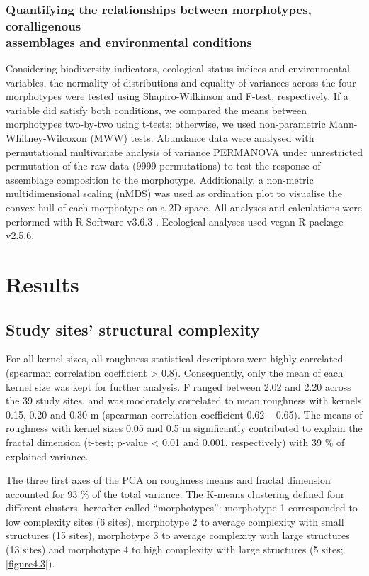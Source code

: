 \subsubsection{Quantifying the relationships between morphotypes, coralligenous\\ assemblages and environmental conditions }\label{chapitre4_2.5.2}
Considering biodiversity indicators, ecological status indices and environmental variables, the normality of distributions and equality of variances across the four morphotypes were tested using Shapiro-Wilkinson and F-test, respectively. If a variable did satisfy both conditions, we compared the means between morphotypes two-by-two using t-tests; otherwise, we used non-parametric Mann-Whitney-Wilcoxon (MWW) tests. Abundance data were analysed with permutational multivariate analysis of variance PERMANOVA \citep{anderson_new_2001} under unrestricted permutation of the raw data (9999 permutations) to test the response of assemblage composition to the morphotype. Additionally, a non-metric multidimensional scaling (nMDS) \citep{clarke_primer_2006} was used as ordination plot to visualise the convex hull of each morphotype on a 2D space. All analyses and calculations were performed with R Software v3.6.3 \citep{r_core_team_r_2020}. Ecological analyses used vegan R package v2.5.6.

\section{Results}\label{chapitre4_3}

\subsection{Study sites’ structural complexity}\label{chapitre4_3.1}
For all kernel sizes, all roughness statistical descriptors were highly correlated (spearman correlation coefficient > 0.8). Consequently, only the mean of each kernel size was kept for further analysis. F ranged between 2.02 and 2.20 across the 39 study sites, and was moderately correlated to mean roughness with kernels 0.15, 0.20 and 0.30 m (spearman correlation coefficient 0.62 – 0.65). The means of roughness with kernel sizes 0.05 and 0.5 m significantly contributed to explain the fractal dimension (t-test; p-value < 0.01 and 0.001, respectively) with 39 \% of explained variance.

The three first axes of the PCA on roughness means and fractal dimension accounted for 93 \% of the total variance. The K-means clustering defined four different clusters, hereafter called “morphotypes”: morphotype 1 corresponded to low complexity sites (6 sites), morphotype 2 to average complexity with small structures (15 sites), morphotype 3 to average complexity with large structures (13 sites) and morphotype 4 to high complexity with large structures (5 sites; \autoref{figure4.3}).

